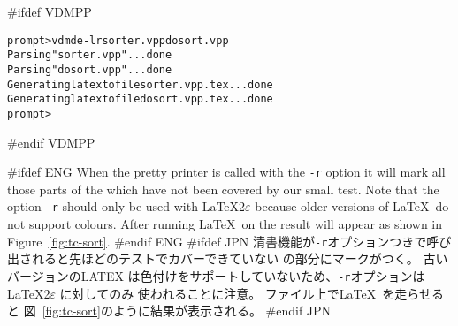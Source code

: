 \documentclass[\pformat,12pt]{article}
\newcommand{\vdmde}{vdmde}
\newcommand{\vdmde}{vppde}
\begin{document}
#ifdef VDMPP
\begin{alltt}
prompt> \vdmde -lr sorter.vpp dosort.vpp 
Parsing "sorter.vpp" ... done
Parsing "dosort.vpp" ... done
Generating latex to file sorter.vpp.tex ... done
Generating latex to file dosort.vpp.tex ... done
prompt>
\end{alltt}
#endif VDMPP

#ifdef ENG
When the pretty printer is called with the {\tt -r} option it will
mark all those parts of the  which have not been covered by our small
test. Note that the option {\tt -r} should only be used with
\LaTeX2$\varepsilon$ because older versions of \LaTeX\ do not
support colours. After running \LaTeX\ on
the result will appear as shown in Figure~\ref{fig:tc-sort}.
#endif ENG
#ifdef JPN
清書機能が{\tt -r}オプションつきで呼び出されると先ほどのテストでカバーできていない
 の部分にマークがつく。
古いバージョンのLATEX は色付けをサポートしていないため、{\tt -r}オプションは\LaTeX2$\varepsilon$ に対してのみ
使われることに注意。
ファイル上で\LaTeX\ を走らせると
図~\ref{fig:tc-sort}のように結果が表示される。
#endif JPN
\end{document}
